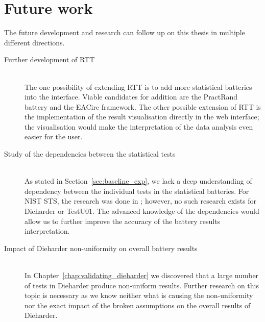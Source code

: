 \documentclass[
	digital,    %
	oneside,
	color,
	11pt,
	nocover,
	notable,
	nolof,
	nolot,
]{fithesis3}
\theoremstyle{definition}
\theoremstyle{remark}
\begin{document}
\section{Future work}
The future development and research can follow up on this thesis in multiple different directions.

\begin{description}
\item[Further development of RTT] \hfill \\
The one possibility of extending RTT is to add more statistical batteries into the interface. Viable candidates for addition are the PractRand battery \cite{practrand} and the EACirc framework. The other possible extension of RTT is the implementation of the result visualisation directly in the web interface; the visualisation would make the interpretation of the data analysis even easier for the user.

\item[Study of the dependencies between the statistical tests] \hfill \\
As stated in Section~\ref{sec:baseline_exp}, we lack a deep understanding of dependency between the individual tests in the statistical batteries. For NIST STS, the research was done in \cite{nist-sts-interpretation-syso}; however, no such research exists for Dieharder or TestU01. The advanced knowledge of the dependencies would allow us to further improve the accuracy of the battery results interpretation.

\item[Impact of Dieharder non-uniformity on overall battery results] \hfill \\
In Chapter~\ref{chap:validating_dieharder} we discovered that a large number of tests in Dieharder produce non-uniform results. Further research on this topic is necessary as we know neither what is causing the non-uniformity nor the exact impact of the broken assumptions on the overall results of Dieharder.

\end{description}

\appendix

\printbibliography
\end{document}
